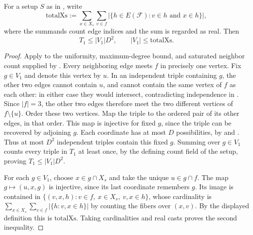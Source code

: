 \begin{lemma}
For a setup $S$ as in ,
write
\[
\mathrm{totalXs}:=\sum_{x\in X_s}\sum_{v\in f}
\bigl|\{h\in E(\mathcal F):v\in h\text{ and }x\in h\}\bigr|,
\]
where the summands count edge indices and the sum is regarded as real.
Then
\[
T_1\le |V_1|D^2,\qquad |V_1|\le\mathrm{totalXs}.
\]
\end{lemma}
\begin{proof}
Apply  to the uniformity,
maximum-degree bound, and saturated neighbor count supplied by
. Every neighboring edge meets
$f$ in precisely one vertex. Fix $g\in V_1$ and denote this vertex by $u$.
In an independent triple containing $g$, the other two edges cannot
contain $u$, and cannot contain the same vertex of $f$ as each other:
in either case they would intersect, contradicting independence in
. Since $|f|=3$, the other two edges
therefore meet the two different vertices of $f\setminus\{u\}$.
Order these two vertices. Map the triple to the ordered pair of its other
edges, in that order. This map is injective for fixed $g$, since the
triple can be recovered by adjoining $g$. Each coordinate has at most
$D$ possibilities, by  and
. Thus at most $D^2$ independent triples
contain this fixed $g$. Summing over $g\in V_1$ counts every triple
in $T_1$ at least once, by the defining count field of the setup, proving
$T_1\le |V_1|D^2$.

For each $g\in V_1$, choose $x\in g\cap X_s$ and take the unique
$u\in g\cap f$. The map $g\mapsto(u,x,g)$ is injective, since its last
coordinate remembers $g$. Its image is contained in
$\{(v,x,h):v\in f,\ x\in X_s,\ v,x\in h\}$, whose cardinality is
$\sum_{x\in X_s}\sum_{v\in f}|\{h:v,x\in h\}|$ by counting the fibers
over $(x,v)$. By the displayed definition this is
$\mathrm{totalXs}$. Taking cardinalities and real casts proves the second
inequality.
\end{proof}
